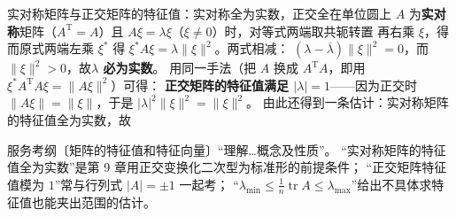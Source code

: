 \begin{fdeep}{实对称矩阵与正交矩阵的特征值：实对称全为实数，正交全在单位圆上}
$A$ 为\textbf{实对称}矩阵（$A^{\mathrm T}=A$）且 $A\xi=\lambda\xi$（$\xi\ne0$）时，对等式两端取共轭转置
再右乘 $\xi$，得
而原式两端左乘 $\xi^{*}$ 得 $\xi^{*}A\xi=\lambda\lVert\xi\rVert^{2}$。两式相减：
$(\lambda-\overline{\lambda})\lVert\xi\rVert^{2}=0$，而 $\lVert\xi\rVert^{2}>0$，故\textbf{$\lambda$ 必为实数}。
用同一手法（把 $A$ 换成 $A^{\mathrm T}A$，即用 $\xi^{*}A^{\mathrm T}A\xi=\lVert A\xi\rVert^{2}$）可得：
\textbf{正交矩阵的特征值满足 $|\lambda|=1$}——因为正交时 $\lVert A\xi\rVert=\lVert\xi\rVert$，于是
$|\lambda|^{2}\lVert\xi\rVert^{2}=\lVert\xi\rVert^{2}$。
由此还得到一条估计：实对称矩阵的特征值全为实数，故

\fbref{}服务考纲〔矩阵的特征值和特征向量〕“理解…概念及性质”。
“实对称矩阵的特征值全为实数”是第 9 章用正交变换化二次型为标准形的前提条件；
“正交矩阵特征值模为 $1$”常与行列式 $\lvert A\rvert=\pm1$ 一起考；
“$\lambda_{\min}\le\frac{1}{n}\operatorname{tr}A\le\lambda_{\max}$”给出不具体求特征值也能夹出范围的估计。
\end{fdeep}

